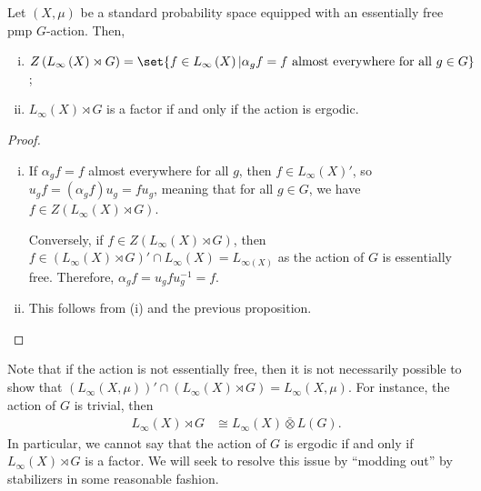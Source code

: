 \documentclass[10pt]{mypackage}
\begin{document}
\begin{corollary}
  Let $\left( X,\mu \right)$ be a standard probability space equipped with an essentially free pmp $G$-action. Then,
  \begin{enumerate}[(i)]
    \item $Z\left( L_{\infty}\left( X \right)\rtimes G \right) = \set{f\in L_{\infty}\left( X \right) | \alpha_gf = f\text{ almost everywhere for all }g\in G}$;
    \item $L_{\infty}\left( X \right)\rtimes G$ is a factor if and only if the action is ergodic.
  \end{enumerate}
\end{corollary}
\begin{proof}\hfill
  \begin{enumerate}[(i)]
    \item If $\alpha_gf = f$ almost everywhere for all $g$, then $f\in L_{\infty}\left( X \right)'$, so $u_gf = \left( \alpha_{g}f \right)u_g = fu_g$, meaning that for all $g\in G$, we have $f\in Z\left( L_{\infty}\left( X \right)\rtimes G \right)$.

      Conversely, if $f\in Z\left( L_{\infty}\left( X \right)\rtimes G \right)$, then $f\in \left( L_{\infty}\left( X \right)\rtimes G \right)'\cap L_{\infty}\left( X \right) = L_{\infty\left( X \right)}$ as the action of $G$ is essentially free. Therefore, $\alpha_gf = u_gfu_g^{-1} = f$.
    \item This follows from (i) and the previous proposition.
  \end{enumerate}
\end{proof}
Note that if the action is not essentially free, then it is not necessarily possible to show that $\left( L_{\infty}\left( X,\mu \right) \right)'\cap \left( L_{\infty}\left( X \right)\rtimes G \right) = L_{\infty}\left( X,\mu \right)$. For instance, the action of $G$ is trivial, then
\begin{align*}
  L_{\infty}\left( X \right)\rtimes G &\cong L_{\infty}\left( X \right)\bar\otimes L(G).
\end{align*}
In particular, we cannot say that the action of $G$ is ergodic if and only if $L_{\infty}\left( X \right)\rtimes G$ is a factor. We will seek to resolve this issue by ``modding out'' by stabilizers in some reasonable fashion.
\end{document}
